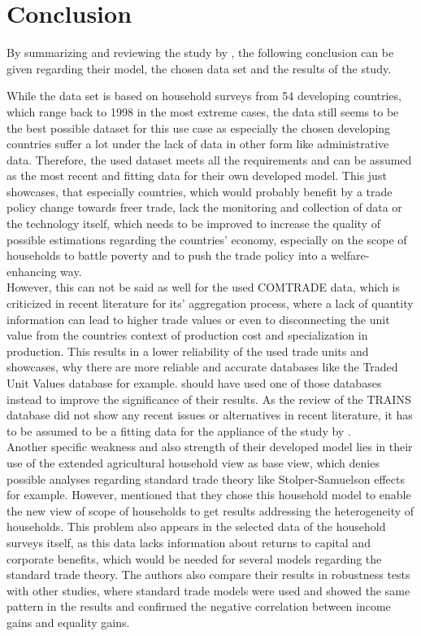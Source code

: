 \section{Conclusion}

By summarizing and reviewing the study by \cite{Artuc.2019}, the following conclusion can be given regarding
their model, the chosen data set and the results of the study.

While the data set is based on household surveys from 54 developing countries, which range back to 1998 in the most extreme
cases, the data still seems to be the best possible dataset for this use case as especially the chosen developing countries
suffer a lot under the lack of data in other form like administrative data. Therefore, the used dataset meets all the requirements
and can be assumed as the most recent and fitting data for their own developed model. This just showcases, that especially
countries, which would probably benefit by a trade policy change towards freer trade, lack the monitoring and collection of
data or the technology itself, which needs to be improved to increase the quality of possible estimations regarding the 
countries' economy, especially on the scope of households to battle poverty and to push the trade policy into a welfare-enhancing way.\\
However, this can not be said as well for the used COMTRADE data, which is criticized in recent literature for its' aggregation process, 
where a lack of quantity information can lead to higher trade values or even to disconnecting the unit value from the countries context of
production cost and specialization in production. This results in a lower reliability of the used trade units and showcases, why there are
more reliable and accurate databases like the Traded Unit Values database for example. \Cite{Artuc.2019} should have used one of those
databases instead to improve the significance of their results. As the review of the TRAINS database did not show any recent issues or 
alternatives in recent literature, it has to be assumed to be a fitting data for the appliance of the study by \cite{Artuc.2019}. \\

Another specific weakness and also strength of their developed model lies in their use of the extended agricultural household
view as base view, which denies possible analyses regarding standard trade theory like Stolper-Samuelson effects for example.
However, \cite{Artuc.2019} mentioned that they chose this household model to enable the new view of scope of households to get 
results addressing the heterogeneity of households. This problem also appears in the selected data of the household surveys 
itself, as this data lacks information about returns to capital and corporate benefits, which would be needed for several 
models regarding the standard trade theory. The authors also compare their results in robustness tests with other studies, 
where standard trade models were used and showed the same pattern in the results and confirmed the negative correlation between
income gains and equality gains.\\

